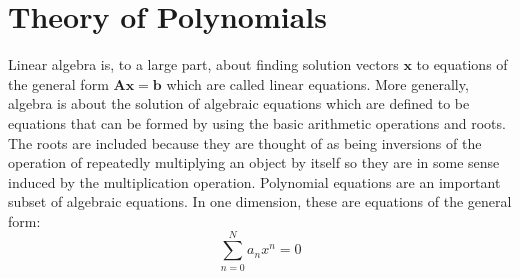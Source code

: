 \section{Theory of Polynomials}
Linear algebra is, to a large part, about finding solution vectors $\mathbf{x}$ to equations of the general form $\mathbf{A x} = \mathbf{b}$ which are called linear equations. More generally, algebra is about the solution of algebraic equations which are defined to be equations that can be formed by using the basic arithmetic operations and roots. The roots are included because they are thought of as being inversions of the operation of repeatedly multiplying an object by itself so they are in some sense induced by the multiplication operation. Polynomial equations are an important subset of algebraic equations. In one dimension, these are equations of the general form:
\begin{equation}
 \sum_{n=0}^N a_n x^n = 0
\end{equation}
